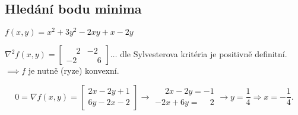 \subsection{Hledání bodu minima}
$f(x, y) = x^2 + 3y^2 - 2xy + x - 2y$

$\nabla^2 f(x, y) =
\begin{bmatrix}
    \phantom{-}2 & -2 \\
    -2 & \phantom{-}6
\end{bmatrix} \dots$ dle Sylvesterova kritéria je positivně definitní. \\
$\implies f $ je nutně (ryze) konvexní.

\[
    0 = \nabla f(x, y) =
    \begin{bmatrix}
        2x-2y + 1 \\
        6y - 2x -2
    \end{bmatrix} \rightarrow
    \begin{matrix}
    \phantom{-}2x - 2y = -1 \\
    -2x + 6y = \phantom{-}2
    \end{matrix} \rightarrow y = \frac{1}{4} \Rightarrow x = -\frac{1}{4}.
\]